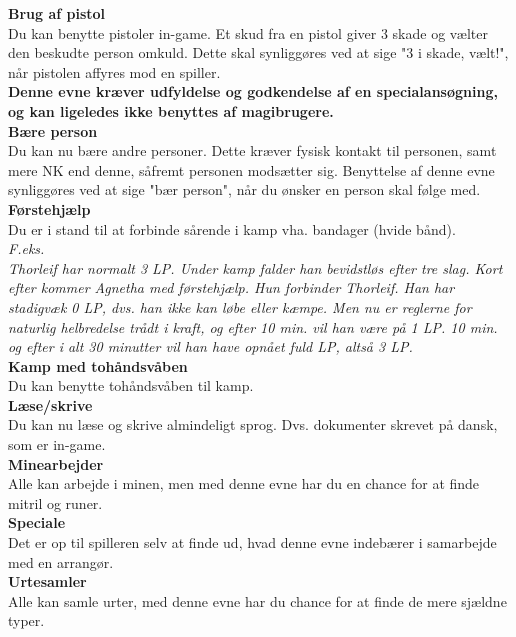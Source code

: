\textbf{Brug af pistol}\\
Du kan benytte pistoler in-game.
Et skud fra en pistol giver 3 skade og vælter den beskudte person omkuld. Dette skal synliggøres ved at sige "3 i skade, vælt!", når pistolen affyres mod en spiller.\\
\textbf{Denne evne kræver udfyldelse og godkendelse af en specialansøgning, og kan ligeledes ikke benyttes af magibrugere.}\\

\textbf{Bære person}\\
Du kan nu bære andre personer. Dette kræver fysisk kontakt til personen, samt mere NK end denne, såfremt personen modsætter sig. Benyttelse af denne evne synliggøres ved at sige "bær person", når du ønsker en person skal følge med.\\

\textbf{Førstehjælp}\\
Du er i stand til at forbinde sårende i kamp vha. bandager (hvide bånd).\\
\textit{F.eks.\\
Thorleif har normalt 3 LP. Under kamp falder han bevidstløs efter tre slag. Kort efter kommer Agnetha med førstehjælp. Hun forbinder Thorleif. Han har stadigvæk 0 LP, dvs. han ikke kan løbe eller kæmpe. Men nu er reglerne for naturlig helbredelse trådt i kraft, og efter 10 min. vil han være på 1 LP. 10 min. og efter i alt 30 minutter vil han have opnået fuld LP, altså 3 LP.}\\

\textbf{Kamp med tohåndsvåben}\\
Du kan benytte tohåndsvåben til kamp.\\

\textbf{Læse/skrive}\\
Du kan nu læse og skrive almindeligt sprog. Dvs. dokumenter skrevet på dansk, som er in-game.\\

\textbf{Minearbejder}\\
Alle kan arbejde i minen, men med denne evne har du en chance for at finde mitril og runer.\\

\textbf{Speciale}\\
Det er op til spilleren selv at finde ud, hvad denne evne indebærer i
samarbejde med en arrangør.\\

\textbf{Urtesamler}\\
Alle kan samle urter, med denne evne har du chance for at finde de mere sjældne typer.\\